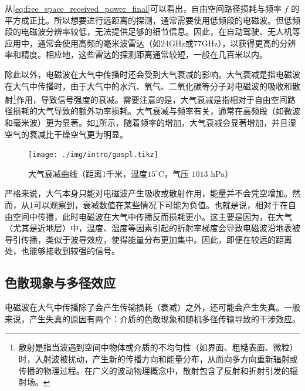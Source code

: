 从\cref{eq:free_space_received_power_final}可以看出，自由空间路径损耗与频率 $f$ 的平方成正比。所以想要进行远距离的探测，通常需要使用低频段的电磁波。但低频段的电磁波分辨率较低，无法提供足够的细节信息。因此，在自动驾驶、无人机等应用中，通常会使用高频的毫米波雷达（如24GHz或77GHz），以获得更高的分辨率和精度。相应地，这些雷达的探测距离通常较短，一般在几百米以内。

除此以外，电磁波在大气中传播时还会受到大气衰减的影响。大气衰减是指电磁波在大气中传播时，由于大气中的水汽、氧气、二氧化碳等分子对电磁波的吸收和散射\footnote{散射是指当波遇到空间中物体或介质的不均匀性（如界面、粗糙表面、微粒）时，入射波被扰动，产生新的传播方向和能量分布，从而向多方向重新辐射或传播的物理过程。在广义的波动物理概念中，散射包含了反射和折射引发的辐射场。}作用，导致信号强度的衰减。需要注意的是，大气衰减是指相对于自由空间路径损耗的大气导致的额外功率损耗。大气衰减与频率有关，通常在高频段（如微波和毫米波）更为显著。如\cref{fig_chp1_gaspl}所示，随着频率的增加，大气衰减会显著增加，并且湿空气的衰减比干燥空气更为明显。

\begin{figure}[htb!]
    \centering
    \texttt{[image: ./img/intro/gaspl.tikz]}
    \caption{大气衰减曲线\supercite{itu_r_p676_11}（距离1千米，温度$15^\circ$C，气压 $1013$ hPa）}
    \label{fig_chp1_gaspl}
\end{figure}

严格来说，大气本身只能对电磁波产生吸收或散射作用，能量并不会凭空增加。然而，从\cref{fig_chp1_gaspl}可以观察到，衰减数值在某些情况下可能为负值。也就是说，相对于在自由空间中传播，此时电磁波在大气中传播反而损耗更小。这主要是因为，在大气（尤其是近地层）中，温度、湿度等因素引起的折射率梯度会导致电磁波沿地表被导引传播，类似于波导效应，使得能量分布更加集中。因此，即便在较远的距离处，也能够接收到较强的信号。

\subsection{色散现象与多径效应}
电磁波在大气中传播除了会产生传输损耗（衰减）之外，还可能会产生失真。一般来说，产生失真的原因有两个：介质的色散现象和随机多径传输导致的干涉效应。

